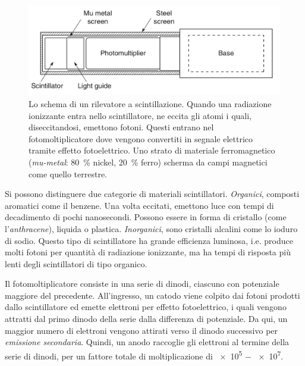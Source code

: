 \documentclass[../main.tex]{subfiles}
\begin{document}
\begin{figure}[b!]
    \centering
    \includegraphics[width=\textwidth]{pmt_trasp.png}
    \caption{Lo schema di un rilevatore a scintillazione. Quando una radiazione ionizzante entra nello scintillatore, ne eccita gli atomi i quali, diseccitandosi, emettono fotoni. Questi entrano nel fotomoltiplicatore dove vengono convertiti in segnale elettrico tramite effetto fotoelettrico. Uno strato di materiale ferromagnetico (\textit{mu-metal}: \SI{80}{\%} nickel, \SI{20}{\%} ferro) scherma da campi magnetici come quello terrestre.
    \cite{spurio}}
    \label{fig:pmt}
\end{figure}

Si possono distinguere due categorie di materiali scintillatori.
\textit{Organici}, composti aromatici come il benzene. Una volta eccitati, emettono luce con tempi di decadimento di pochi nanosecondi. Possono essere in forma di cristallo (come l'\textit{anthracene}), liquida o plastica. \textit{Inorganici}, sono cristalli alcalini come lo ioduro di sodio. Questo tipo di scintillatore ha grande efficienza luminosa, i.e. produce molti fotoni per quantità di radiazione ionizzante, ma ha tempi di risposta più lenti degli scintillatori di tipo organico.

Il fotomoltiplicatore consiste in una serie di dinodi, ciascuno con potenziale maggiore del precedente. All'ingresso, un catodo viene colpito dai fotoni prodotti dallo scintillatore ed emette elettroni per effetto fotoelettrico, i quali vengono attratti dal primo dinodo della serie dalla differenza di potenziale. Da qui, un maggior numero di elettroni vengono attirati verso il dinodo successivo per \textit{emissione secondaria}. Quindi, un anodo raccoglie gli elettroni al termine della serie di dinodi, per un fattore totale di moltiplicazione di \SI{e5}{} $-$ \SI{e7}{}.
\end{document}
